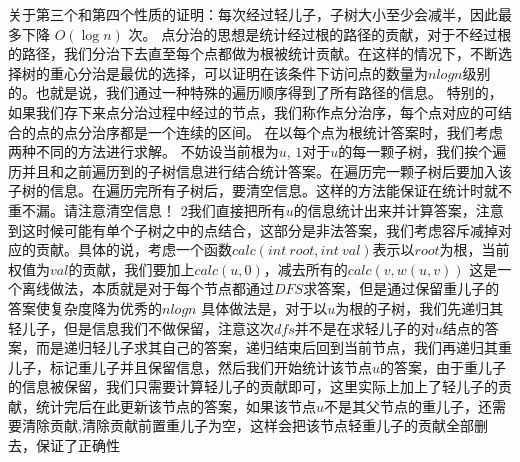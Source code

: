 {}关于第三个和第四个性质的证明：每次经过轻儿子，子树大小至少会减半，因此最多下降 $O(\log n)$ 次。\markdownRendererInterblockSeparator
{}\markdownRendererInterblockSeparator
{}
\markdownRendererSectionEnd \markdownRendererSectionBegin
{}\markdownRendererInterblockSeparator
{}点分治的思想是统计经过根的路径的贡献，对于不经过根的路径，我们分治下去直至每个点都做为根被统计贡献。在这样的情况下，不断选择树的重心分治是最优的选择，可以证明在该条件下访问点的数量为$ nlogn $级别的。也就是说，我们通过一种特殊的遍历顺序得到了所有路径的信息。\markdownRendererParagraphSeparator
{}特别的，如果我们存下来点分治过程中经过的节点，我们称作点分治序，每个点对应的可结合的点的点分治序都是一个连续的区间。\markdownRendererParagraphSeparator
{}在以每个点为根统计答案时，我们考虑两种不同的方法进行求解。\markdownRendererParagraphSeparator
{}不妨设当前根为$ u $,\markdownRendererParagraphSeparator
{}$ 1 $对于$ u $的每一颗子树，我们挨个遍历并且和之前遍历到的子树信息进行结合统计答案。在遍历完一颗子树后要加入该子树的信息。在遍历完所有子树后，要清空信息。这样的方法能保证在统计时就不重不漏。请注意清空信息！\markdownRendererParagraphSeparator
{}$ 2 $我们直接把所有$ u $的信息统计出来并计算答案，注意到这时候可能有单个子树之中的点结合，这部分是非法答案，我们考虑容斥减掉对应的贡献。具体的说，考虑一个函数$ calc(int\ root,int\ val) $表示以$ root $为根，当前权值为$ val $的贡献，我们要加上$ calc(u,0) $，减去所有的$ calc(v,w(u,v)) $\markdownRendererInterblockSeparator
{}\markdownRendererInterblockSeparator
{}
\markdownRendererSectionEnd \markdownRendererSectionBegin
{}\markdownRendererInterblockSeparator
{}这是一个离线做法，本质就是对于每个节点都通过$ DFS $求答案，但是通过保留重儿子的答案使复杂度降为优秀的$ nlogn $\markdownRendererParagraphSeparator
{}具体做法是，对于以$ u $为根的子树，我们先递归其轻儿子，但是信息我们不做保留，注意这次$ dfs $并不是在求轻儿子的对$ u $结点的答案，而是递归轻儿子求其自己的答案，递归结束后回到当前节点，我们再递归其重儿子，标记重儿子并且保留信息，然后我们开始统计该节点$ u $的答案，由于重儿子的信息被保留，我们只需要计算轻儿子的贡献即可，这里实际上加上了轻儿子的贡献，统计完后在此更新该节点的答案，如果该节点$ u $不是其父节点的重儿子，还需要清除贡献,清除贡献前置重儿子为空，这样会把该节点轻重儿子的贡献全部删去，保证了正确性\markdownRendererInterblockSeparator
{}\markdownRendererInterblockSeparator
